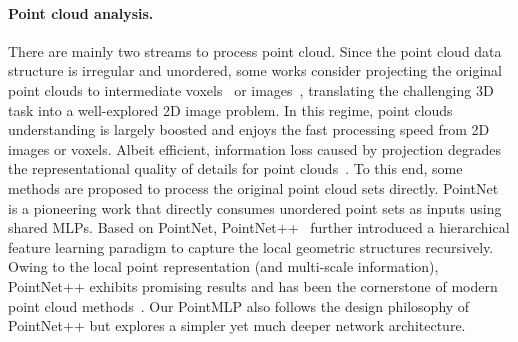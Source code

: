 \paragraph{Point cloud analysis.} There are mainly two streams to process point cloud. 
Since the point cloud data structure is irregular and unordered, some works consider projecting the original point clouds to intermediate voxels~\citep{maturana2015voxnet,shi2020pv} or images~\citep{you2018pvnet,li2020end}, translating the challenging 3D task into a well-explored 2D image problem. In this regime, point clouds understanding is largely boosted and enjoys the fast processing speed from 2D images or voxels. Albeit efficient, information loss caused by projection degrades the representational quality of details for point clouds~\citep{yang2019std}. To this end, some methods are proposed to process the original point cloud sets directly. PointNet~\citep{qi2017pointnet} is a pioneering work that directly consumes unordered point sets as inputs using shared MLPs. Based on PointNet, PointNet++~\citep{qi2017pointnet++} further introduced a hierarchical feature learning paradigm to capture the local geometric structures recursively. Owing to the local point representation (and multi-scale information), PointNet++ exhibits promising results and has been the cornerstone of modern point cloud methods~\citep{wang2019dynamic,fan2021scf,xu2021paconv}. Our PointMLP also follows the design philosophy of PointNet++ but explores a simpler yet much deeper network architecture.


